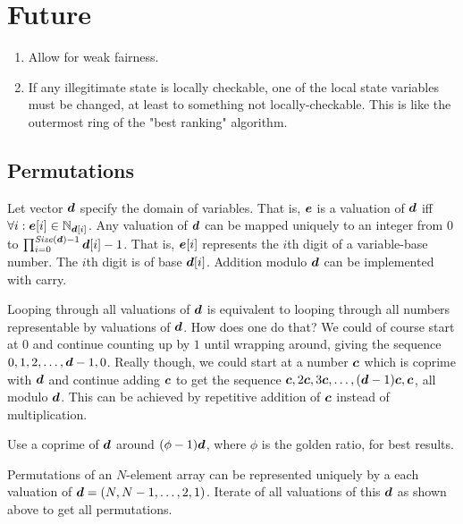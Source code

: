 \section{Future}
\begin{enumerate}
 \item Allow for weak fairness.
 \item If any illegitimate state is locally checkable, one of the local state variables must be changed, at least to something not locally-checkable.
  This is like the outermost ring of the "best ranking" algorithm.
\end{enumerate}

\subsection{Permutations}
Let vector $\boldsymbol{d}$ specify the domain of variables.
That is, $\boldsymbol{e}$ is a valuation of $\boldsymbol{d}$ iff $\forall i: \boldsymbol{e}[i]\in\mathbb{N}_{\boldsymbol{d}[i]}$.
Any valuation of $\boldsymbol{d}$ can be mapped uniquely to an integer from $0$ to $\prod_{i=0}^{\mathit{Size}(\boldsymbol{d})-1} \boldsymbol{d}[i]-1$.
That is, $\boldsymbol{e}[i]$ represents the $i$th digit of a variable-base number.
The $i$th digit is of base $\boldsymbol{d}[i]$.
Addition modulo $\boldsymbol{d}$ can be implemented with carry.

Looping through all valuations of $\boldsymbol{d}$ is equivalent to looping through all numbers representable by valuations of $\boldsymbol{d}$.
How does one do that?
We could of course start at $0$ and continue counting up by $1$ until wrapping around, giving the sequence $0,1,2,\dots,\boldsymbol{d}-1,0$.
Really though, we could start at a number $\boldsymbol{c}$ which is coprime with $\boldsymbol{d}$ and continue adding $\boldsymbol{c}$ to get the sequence $\boldsymbol{c},2\boldsymbol{c},3\boldsymbol{c},\dots,(\boldsymbol{d}-1)\boldsymbol{c},\boldsymbol{c}$, all modulo $\boldsymbol{d}$.
This can be achieved by repetitive addition of $\boldsymbol{c}$ instead of multiplication.

Use a coprime of $\boldsymbol{d}$ around $(\phi-1)\boldsymbol{d}$, where $\phi$ is the golden ratio, for best results.

Permutations of an $N$-element array can be represented uniquely by a each valuation of $\boldsymbol{d}=(N,N-1,\dots,2,1)$.
Iterate of all valuations of this $\boldsymbol{d}$ as shown above to get all permutations.




